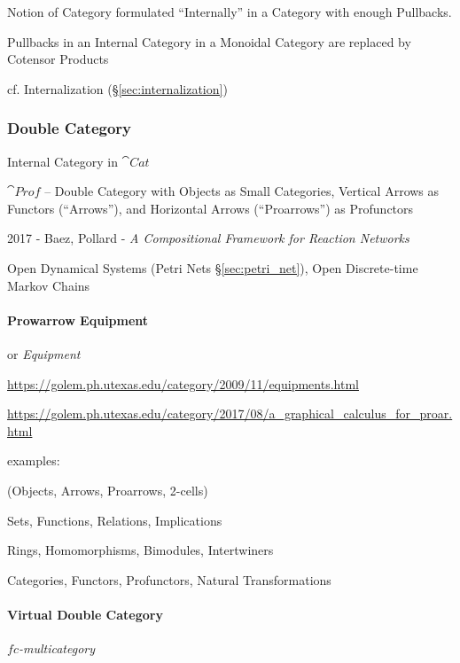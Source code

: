
Notion of Category formulated ``Internally'' in a Category with enough
Pullbacks.

Pullbacks in an Internal Category in a Monoidal Category are replaced
by Cotensor Products

\fist cf. Internalization (\S\ref{sec:internalization})



\subsubsection{Double Category}\label{sec:double_category}

Internal Category in $\cat{Cat}$

$\cat{Prof}$ -- Double Category with Objects as Small Categories, Vertical
Arrows as Functors (``Arrows''), and Horizontal Arrows (``Proarrows'') as
Profunctors

2017 - Baez, Pollard - \emph{A Compositional Framework for Reaction Networks}

Open Dynamical Systems (Petri Nets \S\ref{sec:petri_net}), Open Discrete-time
Markov Chains



\paragraph{Prowarrow Equipment}\label{sec:proarrow_equipment}\hfill

or \emph{Equipment}

\url{https://golem.ph.utexas.edu/category/2009/11/equipments.html}

\url{https://golem.ph.utexas.edu/category/2017/08/a_graphical_calculus_for_proar.html}

examples:

(Objects, Arrows, Proarrows, 2-cells)

Sets, Functions, Relations, Implications

Rings, Homomorphisms, Bimodules, Intertwiners

Categories, Functors, Profunctors, Natural Transformations



\paragraph{Virtual Double Category}\label{sec:virtual_double_category}\hfill

\emph{$fc$-multicategory}

